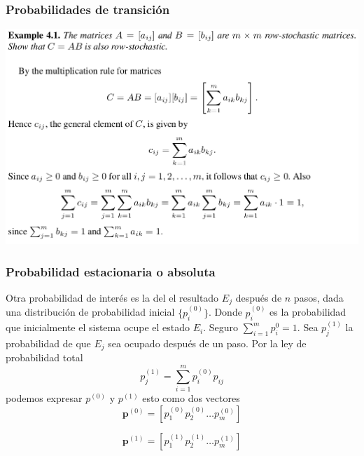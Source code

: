 \documentclass[spanish]{beamer}
\begin{document}
\begin{frame}
\frametitle{Probabilidades de transición}
\begin{center}
\includegraphics[scale=0.3]{im1}
\end{center}

\end{frame}
\begin{frame}
\frametitle{Probabilidad estacionaria o absoluta}
Otra probabilidad de interés es la del el resultado $E_{j}$ después de $n$ pasos, dada una distribución de probabilidad inicial $\lbrace p_{i}^{(0)}\rbrace$.  Donde $p_{i}^{(0)}$ es la probabilidad que inicialmente el sistema ocupe el estado $E_{i}$. Seguro $\sum_{i=1}^{m}p_{i}^{0}=1$. Sea $p_{j}^{(1)}$  la probabilidad de que $E_{j}$ sea ocupado después de un paso. Por la ley de probabilidad total 
\begin{equation*}
p_{j}^{(1)}= \sum_{i=1}^{m}p_{i}^{(0)} p_{ij}
\end{equation*}
podemos expresar $p^{(0)}$ y $p^{(1)}$ esto como dos vectores 
\begin{equation*}
\textbf{p}^{(0)}= \left[ p_{1}^{(0)} p_{2}^{(0)}  \ldots p_{m}^{(0)} \right]  
\end{equation*}

\begin{equation*}
\textbf{p}^{(1)}= \left[ p_{1}^{(1)} p_{2}^{(1)}  \ldots p_{m}^{(1)} \right]  
\end{equation*}


\end{frame}
\end{document}
